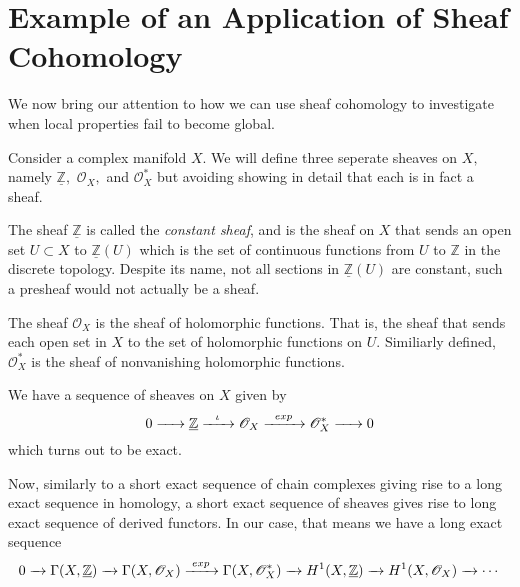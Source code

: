 \documentclass[psamsfonts]{amsart}
\theoremstyle{definition}
\theoremstyle{remark}
\numberwithin{equation}{section}
\begin{document}
\section{Example of an Application of Sheaf Cohomology}
  We now bring our attention to how we can use sheaf cohomology to investigate when local properties fail to become global. 

  Consider a complex manifold $X.$ We will define three seperate sheaves on $X,$ namely $\underline{\mathbb{Z}},$ $\mathscr{O}_X,$ and $\mathscr{O}_X^*$ but avoiding showing in detail that each is in fact a sheaf. 
  
  The sheaf $\underline{\mathbb{Z}}$ is called the \textit{constant sheaf}, and is the sheaf on $X$ that sends an open set $U \subset X$ to $\underline{\mathbb{Z}}(U)$ which is the set of continuous functions from $U$ to $\mathbb{Z}$ in the discrete topology. Despite its name, not all sections in $\underline{\mathbb{Z}}(U)$ are constant, such a presheaf would not actually be a sheaf. 

  The sheaf $\mathscr{O}_X$ is the sheaf of holomorphic functions. That is, the sheaf that sends each open set in $X$ to the set of holomorphic functions on $U.$ Similiarly defined, $\mathscr{O}_X^*$ is the sheaf of nonvanishing holomorphic functions.

  We have a sequence of sheaves on $X$ given by 
  \[0 \xrightarrow{ \hspace{.25cm}  \hspace{.25cm}}  \underline{\mathbb{Z}} \xrightarrow{ \hspace{.25cm} \iota \hspace{.25cm}}  \mathscr{O}_X \xrightarrow{ \hspace{.2cm} exp \hspace{.2cm}} \mathscr{O}_X^* \xrightarrow{ \hspace{.25cm}  \hspace{.25cm}} 0\]
  which turns out to be exact. \cite{cuboulder}

  Now, similarly to a short exact sequence of chain complexes giving rise to a long exact sequence in homology, a short exact sequence of sheaves gives rise to long exact sequence of derived functors. \cite{derived_functor} In our case, that means we have a long exact sequence 
  \[
  0 
    \xrightarrow{ \hspace{.1cm}  \hspace{.1cm}}  
  \Gamma(X,\underline{\mathbb{Z}}) 
    \xrightarrow{ \hspace{.1cm}  \hspace{.1cm}}  
  \Gamma(X,\mathscr{O}_X) 
    \xrightarrow{ \hspace{.1cm} exp \hspace{.1cm}} 
  \Gamma(X,\mathscr{O}_X^*) 
  \xrightarrow{ \hspace{.1cm}  \hspace{.1cm}} 
    H^1(X,\underline{\mathbb{Z}})
  \xrightarrow{ \hspace{.1cm}  \hspace{.1cm}}
    H^1(X,\mathscr{O}_X)
  \xrightarrow{ \hspace{.1cm}  \hspace{.1cm}}
  \cdots
  \]
\end{document}
